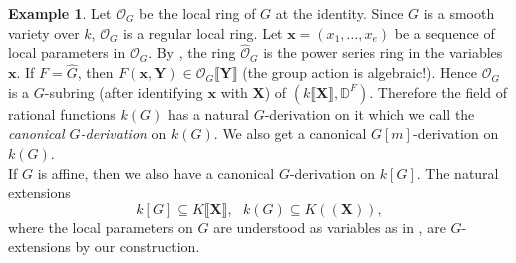 \documentclass[10pt]{amsart}
\theoremstyle{definition}
\newtheorem{example}[theorem]{Example}
\begin{document}
\begin{example}\label{cangex}
Let $\mathcal{O}_G$ be the local ring of $G$ at the identity. Since $G$ is a smooth variety over $k$, $\mathcal{O}_G$ is a regular local ring. Let $\mathbf{x}=(x_1,\ldots,x_e)$ be a sequence of local parameters in $\mathcal{O}_G$. By \cite[Thm 30.6(i)]{mat}, the ring $\widehat{\mathcal{O}}_G$ is the power series ring in the variables $\mathbf{x}$. If $F=\widehat{G}$, then $F(\mathbf{x},\mathbf{Y})\in \mathcal{O}_G\llbracket \mathbf{Y}\rrbracket$ (the group action is algebraic!). Hence $\mathcal{O}_G$ is a $G$-subring (after identifying $\mathbf{x}$ with $\mathbf{X}$) of $(k\llbracket \mathbf{X}\rrbracket,\mathbb{D}^F)$. Therefore the field of rational functions $k(G)$ has a natural $G$-derivation on it which we call the \emph{canonical  $G$-derivation} on $k(G)$.
We also get a canonical $G[m]$-derivation on $k(G)$.
\\
If $G$ is affine, then we also have a canonical $G$-derivation on $k[G]$. The natural extensions
$$k[G]\subseteq K\llbracket \mathbf{X}\rrbracket,\ \ \ k(G)\subseteq K((\mathbf{X})),$$
where the local parameters on $G$ are understood as variables as in \cite[Thm 30.6(i)]{mat}, are $G$-extensions by our construction.
\end{example}
\end{document}
